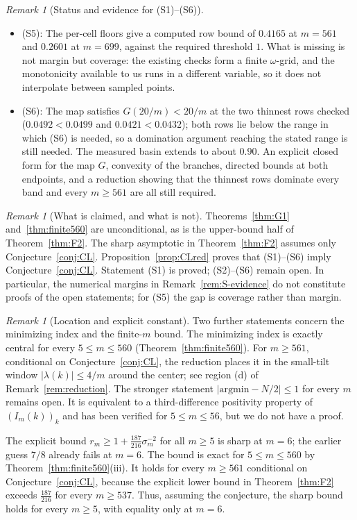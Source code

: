 \documentclass[11pt]{amsart}
\theoremstyle{plain}
\theoremstyle{definition}
\theoremstyle{remark}
\newtheorem{remark}[theorem]{Remark}
\begin{document}
\begin{remark}[Status and evidence for (S1)--(S6)]
\begin{itemize}
well within $0.89$.
\item (S5): The per-cell floors give a computed row bound of $0.4165$ at
$m=561$ and $0.2601$ at $m=699$, against the required threshold $1$. What is
missing is not margin but coverage: the existing checks form a finite $\omega$-grid, and the monotonicity available to us runs in a different variable, so it does not interpolate between sampled points.
\item (S6): The map satisfies $G(20/m)<20/m$ at the two thinnest rows
checked ($0.0492<0.0499$ and $0.0421<0.0432$); both rows lie below the
range in which (S6) is needed, so a domination argument reaching the stated range is still needed. The measured basin extends to about
$0.90$. An explicit closed form for the map $G$, convexity of the
branches, directed bounds at both endpoints, and a reduction showing that
the thinnest rows dominate every band and every $m\ge561$ are all still
required.
\end{itemize}
\end{remark}

\begin{remark}[What is claimed, and what is not]
Theorems~\ref{thm:G1} and~\ref{thm:finite560} are unconditional, as is the
upper-bound half of Theorem~\ref{thm:F2}. The sharp asymptotic in
Theorem~\ref{thm:F2} assumes only Conjecture~\ref{conj:CL}.
Proposition~\ref{prop:CLred} proves that (S1)--(S6) imply
Conjecture~\ref{conj:CL}. Statement (S1) is proved; (S2)--(S6) remain
open. In particular, the numerical margins in
Remark~\ref{rem:S-evidence} do not constitute proofs of the open
statements; for (S5) the gap is coverage rather than margin.
\end{remark}

\begin{remark}[Location and explicit constant]
Two further statements concern the minimizing index and the finite-$m$
bound. The minimizing index is exactly central for every
$5\le m\le560$ (Theorem~\ref{thm:finite560}). For $m\ge561$, conditional
on Conjecture~\ref{conj:CL}, the reduction places it in the small-tilt
window $|\lambda(k)|\le4/m$ around the center; see region (d) of
Remark~\ref{rem:reduction}. The stronger statement
$|\mathrm{argmin}-N/2|\le1$ for every $m$ remains open. It is equivalent
to a third-difference positivity property of $(I_m(k))_k$ and has been
verified for $5\le m\le56$, but we do not have a proof.

The explicit bound
$r_m\ge 1+\tfrac{187}{216}\sigma_m^{-2}$ for all $m\ge5$ is sharp at
$m=6$; the earlier guess $7/8$ already fails at $m=6$. The bound is exact
for $5\le m\le560$ by Theorem~\ref{thm:finite560}(iii). It holds for every
$m\ge561$ conditional on Conjecture~\ref{conj:CL}, because the explicit
lower bound in Theorem~\ref{thm:F2} exceeds $\tfrac{187}{216}$ for every
$m\ge537$. Thus, assuming the conjecture, the sharp bound holds for every
$m\ge5$, with equality only at $m=6$.
\end{remark}
\end{document}
